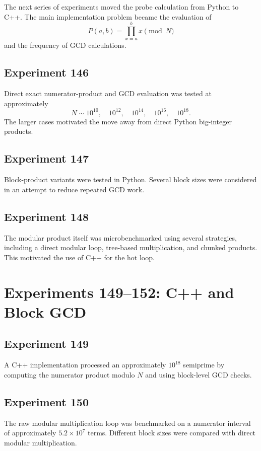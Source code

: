 \documentclass[11pt,a4paper]{article}
\begin{document}
The next series of experiments moved the probe calculation from Python to C++. The main implementation problem became the evaluation of
\[
P(a,b)=\prod_{x=a}^{b}x\pmod N
\]
and the frequency of GCD calculations.

\subsection{Experiment 146}

Direct exact numerator-product and GCD evaluation was tested at approximately
\[
N\sim10^{10},
\quad
10^{12},
\quad
10^{14},
\quad
10^{16},
\quad
10^{18}.
\]
The larger cases motivated the move away from direct Python big-integer products.

\subsection{Experiment 147}

Block-product variants were tested in Python. Several block sizes were considered in an attempt to reduce repeated GCD work.

\subsection{Experiment 148}

The modular product itself was microbenchmarked using several strategies, including a direct modular loop, tree-based multiplication, and chunked products. This motivated the use of C++ for the hot loop.

\section{Experiments 149--152: C++ and Block GCD}

\subsection{Experiment 149}

A C++ implementation processed an approximately $10^{18}$ semiprime by computing the numerator product modulo $N$ and using block-level GCD checks.

\subsection{Experiment 150}

The raw modular multiplication loop was benchmarked on a numerator interval of approximately $5.2\times10^7$ terms. Different block sizes were compared with direct modular multiplication.
\end{document}

